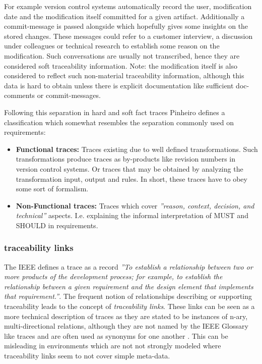 For example version control systems automatically record the user, modification date and the modification itself committed for a given artifact.
Additionally a commit-message is passed alongside which hopefully gives some insights on the stored changes.
These messages could refer to a customer interview, a discussion under colleagues or technical research to establish some reason on the modification. 
Such conversations are usually not transcribed, hence they are considered soft traceability information.
Note: the modification itself is also considered to reflect such non-material traceability information, although this data is hard to obtain unless there is explicit documentation like sufficient doc-comments or commit-messages.

Following this separation in hard and soft fact traces Pinheiro \cite{Pinheiro} defines a classification which somewhat resembles the separation commonly used on requirements:
\begin{itemize}

\item
\textbf{Functional traces:}
Traces existing due to well defined transformations. Such transformations produce traces as by-products like revision numbers in version control systems. Or traces that may be obtained by analyzing the transformation input, output and rules. In short, these traces have to obey some sort of formalism.

\item
\textbf{Non-Functional traces:}
Traces which cover \textit{''reason, context, decision, and technical''} aspects. I.e. explaining the informal interpretation of MUST and SHOULD in requirements.

\end{itemize}

\subsubsection{traceability links}
The IEEE \cite{IEEEGlossary} defines a trace as a record \textit{''To establish a relationship between two or more products of the development process; for example, to establish the relationship between a given requirement and the design element that implements that requirement.''}. 
The frequent notion of relationships describing or supporting traceability leads to the concept of \textit{traceability links}.
These links can be seen as a more technical description of traces as they are stated to be instances of  n-ary, multi-directional relations, although they are not named by the IEEE Glossary like traces and are often used as synonyms for one another \cite{TraceabilitySurvey}.
This can be misleading in environments which are not not strongly modeled where traceability links seem to not cover simple meta-data.

